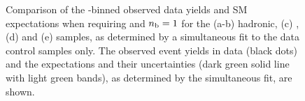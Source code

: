 \begin{figure}[t!]
\begin{center}
{    } 
    \caption{\label{fig:best-fit-control-only-ge4j1b} Comparison of the
      \scalht-binned observed data yields and SM expectations when
      requiring \njethigh and $n_{\text{b}} = 1$ for the (a-b) hadronic, (c)
      \mj, (d) \mmj and (e) \gj samples, as determined by a
      simultaneous fit to the data control samples only. The observed
      event yields in data (black dots) and the expectations and their
      uncertainties (dark green solid line with light green bands), as
      determined by the simultaneous fit, are shown. }
  \end{center}
\end{figure}

